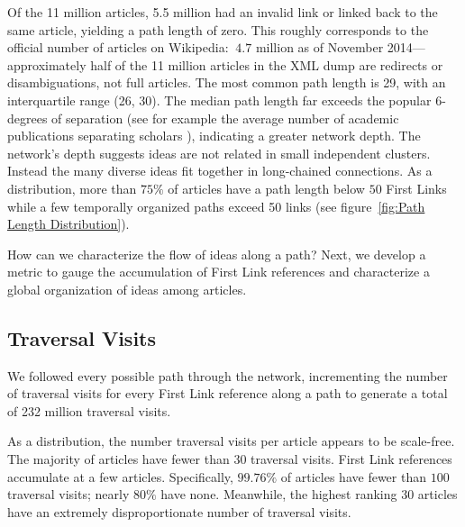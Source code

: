 \documentclass[pre,twocolumn,twoside,superscriptaddress,floatfix, aps, 10pt]{revtex4-1}
\begin{document}
Of the 11 million articles, 5.5 million had an invalid link or linked back to the same article, yielding a path length of zero. 
This roughly corresponds to the official number of articles on Wikipedia: 
$~4.7$ million as of November 2014---approximately half of the 11 million 
articles in the XML dump are redirects or disambiguations, not full articles.
The most common path length is 29, with an interquartile range (26, 30).
The median path length far exceeds the popular 6-degrees of separation (see for 
example the average number of academic publications separating scholars 
\cite{six_degrees}), indicating a greater network depth. 
The network's depth suggests ideas are not related in small independent clusters. 
Instead the many diverse ideas fit together in long-chained connections.
As a distribution, more than $75\%$ of articles have a path length below 
$50$ First Links 
while a few temporally organized paths exceed 50 links 
(see figure~\ref{fig:Path Length Distribution}). 

How can we characterize the flow of ideas along a path? Next, we develop 
a metric to gauge the accumulation of First Link references
and characterize a global organization 
of ideas among articles.




\subsection{Traversal Visits}

We followed every possible path through the network, incrementing
the number of traversal visits for every First Link reference along a path 
to generate a total of 232 million traversal visits.

As a distribution, the number traversal visits per article appears to be scale-free. 
The majority of articles have fewer than 30 traversal visits. 
First Link references accumulate at a few articles.
Specifically, $99.76\%$ of articles have fewer than $100$ traversal visits; nearly $80\%$ have none. 
Meanwhile, the highest ranking 30 articles have an extremely disproportionate number of traversal visits.
\end{document}
